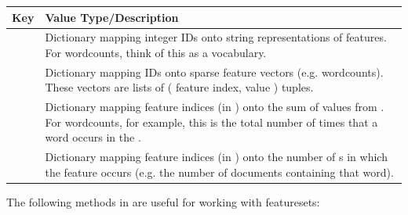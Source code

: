 \documentclass[letterpaper,10pt,english]{sphinxmanual}
\begin{document}
\begin{tabulary}{\linewidth}{|L|L|}
\hline
\textsf{\relax 
Key
} & \textsf{\relax 
Value Type/Description
}\\
\hline
{}
 & 
Dictionary mapping integer IDs onto string representations of
features. For wordcounts, think of this as a vocabulary.
\\

 & 
Dictionary mapping {\hyperref[tethne.classes.paper:tethne.classes.paper.Paper]{}} IDs onto sparse feature vectors
(e.g. wordcounts). These vectors are lists of ( feature index,
value ) tuples.
\\

 & 
Dictionary mapping feature indices (in ) onto the sum of
values from . For wordcounts, for example, this is the
total number of times that a word occurs in the {\hyperref[tethne.classes.corpus:tethne.classes.corpus.Corpus]{}}.
\\

 & 
Dictionary mapping feature indices (in ) onto the number
of {\hyperref[tethne.classes.paper:tethne.classes.paper.Paper]{}}s in which the feature occurs (e.g. the number
of documents containing that word).
\\
\hline\end{tabulary}


The following methods in {\hyperref[tethne.classes.corpus:tethne.classes.corpus.Corpus]{}} are useful for working with featuresets:
\end{document}
